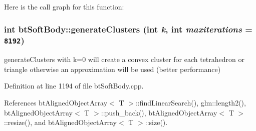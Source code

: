 Here is the call graph for this function:\hypertarget{classbt_soft_body_9915ca0d99dbeb9f39221dab218d5208}{
\subsubsection[generateClusters]{\setlength{\rightskip}{0pt plus 5cm}int btSoftBody::generateClusters (int {\em k}, \/  int {\em maxiterations} = {\tt 8192})}}
\label{classbt_soft_body_9915ca0d99dbeb9f39221dab218d5208}


generateClusters with k=0 will create a convex cluster for each tetrahedron or triangle otherwise an approximation will be used (better performance) 

Definition at line 1194 of file btSoftBody.cpp.

References btAlignedObjectArray$<$ T $>$::findLinearSearch(), glm::length2(), btAlignedObjectArray$<$ T $>$::push\_\-back(), btAlignedObjectArray$<$ T $>$::resize(), and btAlignedObjectArray$<$ T $>$::size().

